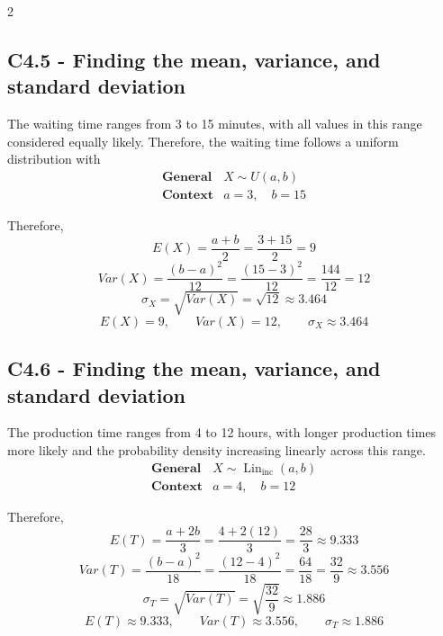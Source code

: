 \begin{multicols}{2}
	
	\subsection*{C4.5 - Finding the mean, variance, and standard deviation}
	\label{subsec:c4-solution-waiting-time}
	
	The waiting time ranges from 3 to 15 minutes, with all values in this
	range considered equally likely. Therefore, the waiting time follows
	a uniform distribution with
	\[
	\begin{array}{c|c}
		\textbf{General}
		&
		X\sim U(a,b)
		\\[6pt]
		\textbf{Context}
		&
		a=3,\quad b=15
	\end{array}
	\]
	
	Therefore,
	\[
	E(X)
	=
	\frac{a+b}{2}
	=
	\frac{3+15}{2}
	=
	9
	\]
	\[
	Var(X)
	=
	\frac{(b-a)^2}{12}
	=
	\frac{(15-3)^2}{12}
	=
	\frac{144}{12}
	=
	12
	\]
	\[
	\sigma_X
	=
	\sqrt{Var(X)}
	=
	\sqrt{12}
	\approx3.464
	\]	
	\[
	\boxed{
		E(X)=9,\qquad
		Var(X)=12,\qquad
		\sigma_X\approx3.464
	}
	\]
	
	
	\subsection*{C4.6 - Finding the mean, variance, and standard deviation}
	\label{subsec:c4-solution-production-time}
	
	The production time ranges from 4 to 12 hours, with longer production
	times more likely and the probability density increasing linearly
	across this range.
	\[
	\begin{array}{c|c}
		\textbf{General}
		&
		X\sim\operatorname{Lin}_{\mathrm{inc}}(a,b)
		\\[6pt]
		\textbf{Context}
		&
		a=4,\quad b=12
	\end{array}
	\]
	
	Therefore,
	\[
	E(T)
	=
	\frac{a+2b}{3}
	=
	\frac{4+2(12)}{3}
	=
	\frac{28}{3}
	\approx9.333
	\]
	\[
	Var(T)
	=
	\frac{(b-a)^2}{18}
	=
	\frac{(12-4)^2}{18}
	=
	\frac{64}{18}
	=
	\frac{32}{9}
	\approx3.556
	\]
	\[
	\sigma_T
	=
	\sqrt{Var(T)}
	=
	\sqrt{\frac{32}{9}}
	\approx1.886
	\]
	\[
	\boxed{
		E(T)\approx9.333,\qquad
		Var(T)\approx3.556,\qquad
		\sigma_T\approx1.886
	}
	\]
	
	\end{multicols}

